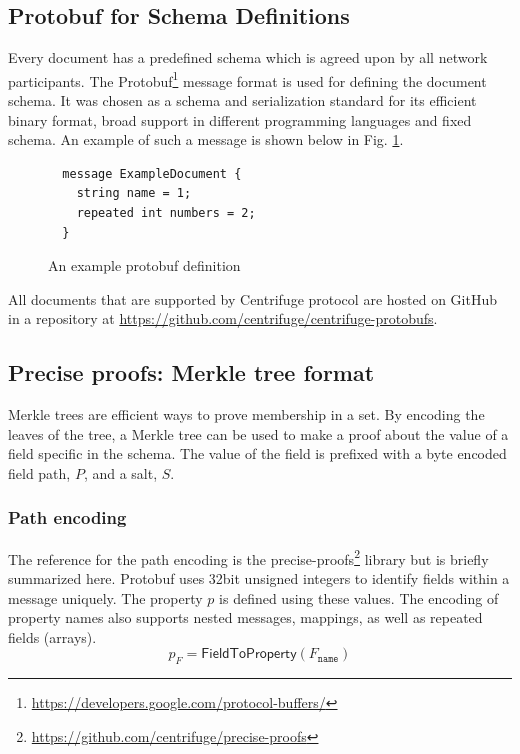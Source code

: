 \subsection{Protobuf for Schema Definitions}\label{sec:protobuf_schema}
Every document has a predefined schema which is agreed upon by all network participants. The Protobuf\footnote{\url{https://developers.google.com/protocol-buffers/}} message format is used for defining the document schema. It was chosen as a schema and serialization standard for its efficient binary format, broad support in different programming languages and fixed schema. An example of such a message is shown below in Fig. \ref{fig:example_document}. 

\begin{figure}[ht]
  \caption{An example protobuf definition}
  \label{fig:example_document}
  \begin{lstlisting}
  message ExampleDocument {
    string name = 1;
    repeated int numbers = 2;
  }\end{lstlisting}
\end{figure}

All documents that are supported by Centrifuge protocol are hosted on GitHub in a repository at \url{https://github.com/centrifuge/centrifuge-protobufs}.  



\subsection{Precise proofs: Merkle tree format}\label{sec:precise_proofs}
Merkle trees are efficient ways to prove membership in a set. By encoding the leaves of the tree, a Merkle tree can be used to make a proof about the value of a field specific in the schema. The value of the field is prefixed with a byte encoded field path, $P$, and a salt, $S$. 


\subsubsection{Path encoding}
The reference for the path encoding is the precise-proofs\footnote{\url{https://github.com/centrifuge/precise-proofs}} library but is briefly summarized here. Protobuf uses 32bit unsigned integers to identify fields within a message uniquely. The property $p$ is defined using these values. The encoding of property names also supports nested messages, mappings, as well as repeated fields (arrays). 
\begin{equation}
    p_{F} = \mathsf{FieldToProperty}(F_{\texttt{name}})
\end{equation}

